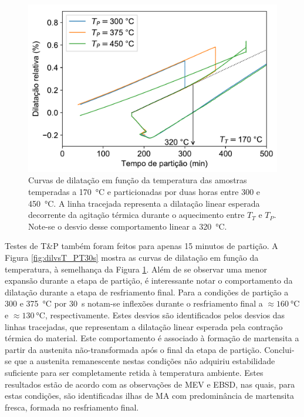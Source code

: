 \begin{figure}
  \includegraphics[width=.8\textwidth]{img/dilatometria/dlxT_qPT2h_fc.pdf}
  \caption{Curvas de dilatação em função da temperatura das amostras temperadas a \SI{170}{\degreeCelsius} e particionadas por duas horas entre 300 e \SI{450}{\degreeCelsius}. A linha tracejada representa a dilatação linear esperada decorrente da agitação térmica durante o aquecimento entre $T_T$ e $T_P$. Note-se o desvio desse comportamento linear a \SI{320}{\degreeCelsius}.}
  \label{fig:dilvsT_PT2h}
\end{figure}

Testes de T\&P também foram feitos para apenas 15 minutos de partição. A Figura \ref{fig:dilvsT_PT30s} mostra as curvas de dilatação em função da temperatura, à semelhança da Figura \ref{fig:dilvsT_PT2h}. Além de se observar uma menor expansão durante a etapa de partição, é interessante notar o comportamento da dilatação durante a etapa de resfriamento final. 
Para a condições de partição a 300 e \SI{375}{\degreeCelsius} por 30~s notam-se inflexões durante o resfriamento final a $\approx \SI{160}{\degreeCelsius}$ e $\approx \SI{130}{\degreeCelsius}$, respectivamente. Estes desvios são identificados pelos desvios das linhas tracejadas, que representam a dilatação linear esperada pela contração térmica do material.
Este comportamento é associado à formação de martensita a partir da austenita não-transformada após o final da etapa de partição. Conclui-se que a austenita remanescente nestas condições não adquiriu estabilidade suficiente para ser completamente retida à temperatura ambiente. Estes resultados estão de acordo com as observações de MEV e EBSD, nas quais, para estas condições, são identificadas ilhas de MA com predominância de martensita fresca, formada no resfriamento final.

